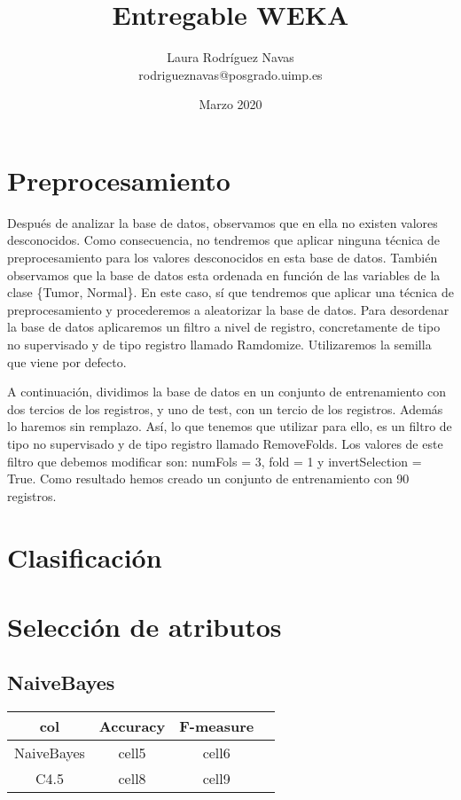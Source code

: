 \documentclass{article}
\title{Entregable WEKA}
\author{Laura Rodríguez Navas \\ rodrigueznavas@posgrado.uimp.es}
\date{Marzo 2020}
\begin{document}
\maketitle

\section*{Preprocesamiento}

Después de analizar la base de datos, observamos que en ella no existen valores desconocidos. Como consecuencia, no tendremos que aplicar ninguna técnica de preprocesamiento para los valores desconocidos en esta base de datos. También observamos que la base de datos esta ordenada en función de las variables de la clase \{Tumor, Normal\}. En este caso, sí que tendremos que aplicar una técnica de preprocesamiento y procederemos a aleatorizar la base de datos. Para desordenar la base de datos aplicaremos un filtro a nivel de registro, concretamente de tipo no supervisado y de tipo registro llamado Ramdomize. Utilizaremos la semilla que viene por defecto. 

A continuación, dividimos la base de datos en un conjunto de entrenamiento con dos tercios de los registros, y uno de test, con un tercio de los registros. Además lo haremos sin remplazo. Así, lo que tenemos que utilizar para ello, es un filtro de tipo no supervisado y de tipo registro llamado RemoveFolds. Los valores de este filtro que debemos modificar son: numFols = 3, fold = 1 y invertSelection = True. Como resultado hemos creado un conjunto de entrenamiento con 90 registros.

\section*{Clasificación}

\section*{Selección de atributos}

\subsection*{NaiveBayes}

\begin{center}
	\begin{tabular}{ |c|c|c|c| } 
		\hline
		col & Accuracy & F-measure \\
		\hline
		NaiveBayes& cell5 & cell6 \\ 
		C4.5 & cell8 & cell9 \\ 
		\hline
	\end{tabular}
\end{center}
\end{document}
